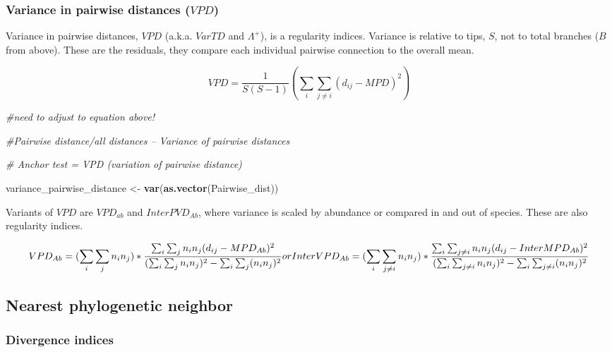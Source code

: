 \documentclass[]{book}
\newenvironment{Shaded}{\begin{snugshade}}{\end{snugshade}}
\newcommand{\KeywordTok}[1]{\textcolor[rgb]{0.13,0.29,0.53}{\textbf{{#1}}}}
\newcommand{\StringTok}[1]{\textcolor[rgb]{0.31,0.60,0.02}{{#1}}}
\newcommand{\CommentTok}[1]{\textcolor[rgb]{0.56,0.35,0.01}{\textit{{#1}}}}
\newcommand{\NormalTok}[1]{{#1}}
\theoremstyle{definition}
\theoremstyle{definition}
\theoremstyle{definition}
\theoremstyle{remark}
\begin{document}
\subsubsection{\texorpdfstring{Variance in pairwise distances
(\(VPD\))}{Variance in pairwise distances (VPD)}}\label{variance-in-pairwise-distances-vpd}

Variance in pairwise distances, \(VPD\) (a.k.a. \(VarTD\) and
\(\Lambda^+\)), is a regularity indices. \citet{Clarke2001} Variance is
relative to tips, \(S\), not to total branches (\(B\) from above). These
are the residuals, they compare each individual pairwise connection to
the overall mean.

\[VPD = \dfrac{1}{S(S-1)} (\sum_{i} \sum_{j \ne i} {(d_{ij} - MPD)^2})\]

\begin{Shaded}
\begin{Highlighting}[]
\CommentTok{#need to adjust to equation above!}

\CommentTok{#Pairwise distance/all distances -- Variance of pairwise distances}

\CommentTok{# Anchor test = VPD (variation of pairwise distance)  }

\NormalTok{variance_pairwise_distance <-}\StringTok{ }\KeywordTok{var}\NormalTok{(}\KeywordTok{as.vector}\NormalTok{(Pairwise_dist))}
\end{Highlighting}
\end{Shaded}

Variants of \(VPD\) are \(VPD_{ab}\) and \(InterPVD_{Ab}\), where
variance is scaled by abundance or compared in and out of species. These
are also regularity indices.

\[
VPD_{Ab}= 
(\sum_{i} \sum_{j} n_{i} n_{j}) *
\dfrac{\sum_{i} \sum_{j} n_{i} n_{j} (d_{ij} - MPD_{Ab})^2}
{(\sum_{i} \sum_{j} n_{i} n_{j})^2 - \sum_{i} \sum_{j} (n_{i} n_{j})^2}
\\
or
\\
InterVPD_{Ab} = 
(\sum_{i} \sum_{j \ne i} n_{i} n_{j}) *
\dfrac{\sum_{i} \sum_{j \ne i} n_{i} n_{j} (d_{ij} - InterMPD_{Ab})^2}
{(\sum_{i} \sum_{j \ne i} n_{i} n_{j})^2 - \sum_{i} \sum_{j \ne i} (n_{i} n_{j})^2}
\]

\hypertarget{nearest-phylogenetic-neighbor}{\subsection{Nearest
phylogenetic neighbor}\label{nearest-phylogenetic-neighbor}}

\subsubsection{Divergence indices}\label{divergence-indices}
\end{document}
